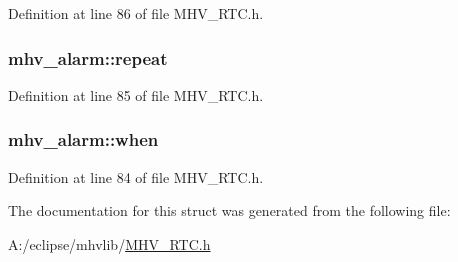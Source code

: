 \-Definition at line 86 of file \-M\-H\-V\-\_\-\-R\-T\-C.\-h.

\hypertarget{structmhv__alarm_ad8195c11cd5d6ff3bb37d01185c04af2}{
\subsubsection[{repeat}]{ {\bf mhv\-\_\-alarm\-::repeat}}}
\label{structmhv__alarm_ad8195c11cd5d6ff3bb37d01185c04af2}


\-Definition at line 85 of file \-M\-H\-V\-\_\-\-R\-T\-C.\-h.

\hypertarget{structmhv__alarm_acbab8b3b4efa4d891d598cbd5b47fb7c}{
\subsubsection[{when}]{ {\bf mhv\-\_\-alarm\-::when}}}
\label{structmhv__alarm_acbab8b3b4efa4d891d598cbd5b47fb7c}


\-Definition at line 84 of file \-M\-H\-V\-\_\-\-R\-T\-C.\-h.



\-The documentation for this struct was generated from the following file\-:\begin{DoxyCompactItemize}
\item 
\-A\-:/eclipse/mhvlib/\hyperlink{_m_h_v___r_t_c_8h}{\-M\-H\-V\-\_\-\-R\-T\-C.\-h}\end{DoxyCompactItemize}
